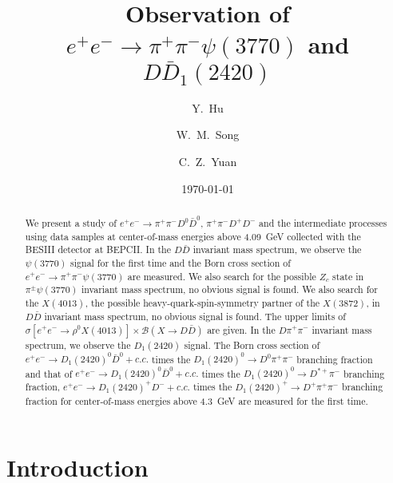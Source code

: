 \documentclass[aps,preprint,superscriptaddress,12pt,tightenlines]{revtex4}
\newcommand{\EE}{e^+e^-}
\newcommand{\pp}{\pi^+\pi^-}
\newcommand{\ddn}{D^0\bar{D}^0}
\newcommand{\ddc}{D^+D^-}
\begin{document}
\linenumbers

\graphicspath{{figure/}}


\title{\boldmath
Observation of $e^{+}e^{-}\rightarrow \pi^{+}\pi^{-}\psi(3770)$
and $D\bar{D}_{1}(2420)$}
\author{Y.~Hu}
\author{W.~M.~Song}
\author{C.~Z.~Yuan }
\address{Institute of High Energy Physics, Beijing, 100049, China }
\date{\today}

\begin{abstract}

We present a study of $e^{+}e^{-}\to \pp\ddn$, $\pp\ddc$ and the
intermediate processes using data samples at center-of-mass
energies above 4.09~GeV collected with the BESIII detector at
BEPCII. In the $D\bar{D}$ invariant mass spectrum, we observe the
$\psi(3770)$ signal for the first time and the Born cross section
of $e^{+}e^{-}\to \pi^{+}\pi^{-}\psi(3770)$ are measured. We also
search for the possible $Z_{c}$ state in $\pi^{\pm}\psi(3770)$
invariant mass spectrum, no obvious signal is found.  We also
search for the $X(4013)$, the possible heavy-quark-spin-symmetry partner of
the $X(3872)$, in $D\bar{D}$ invariant mass spectrum, no obvious
signal is found. The upper limits of
$\sigma[e^{+}e^{-}\to \rho^{0}X(4013)]\times \mathcal{B}(X\to
D\bar{D})$ are given. In the $D\pi^{+}\pi^{-}$ invariant mass
spectrum, we observe the $D_{1}(2420)$ signal. The Born cross
section of $\EE\to D_{1}(2420)^{0}\bar{D}^{0}+c.c.$ times the
$D_{1}(2420)^{0}\to D^{0}\pi^{+}\pi^{-}$ branching fraction and
that of $\EE\to D_{1}(2420)^{0}\bar{D}^{0}+c.c.$ times the
$D_{1}(2420)^{0}\to D^{*+}\pi^{-}$ branching fraction, $\EE\to D_{1}(2420)^{+}D^{-}+c.c.$ times the
$D_{1}(2420)^{+}\to D^{+}\pi^{+}\pi^{-}$ branching fraction for
center-of-mass energies above 4.3~GeV are measured for the first
time.

\end{abstract}


\maketitle

\section{Introduction}
\end{document}
